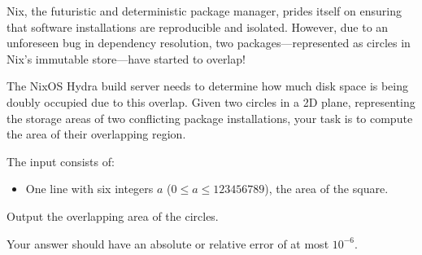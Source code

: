 \problemname{}


\newcommand{\maxa}{123456789}

Nix, the futuristic and deterministic package manager, prides itself on ensuring that software installations are reproducible and isolated. However, due to an unforeseen bug in dependency resolution, two packages—represented as circles in Nix’s immutable store—have started to overlap!

The NixOS Hydra build server needs to determine how much disk space is being doubly occupied due to this overlap. Given two circles in a 2D plane, representing the storage areas of two conflicting package installations, your task is to compute the area of their overlapping region.

\begin{Input}
    The input consists of:
    \begin{itemize}
        \item One line with six integers $a$ ($0\leq a\leq \maxa$), the area of the square.
    \end{itemize}
\end{Input}

\begin{Output}
    Output the overlapping area of the circles.

    Your answer should have an absolute or relative error of at most $10^{-6}$.
\end{Output}
